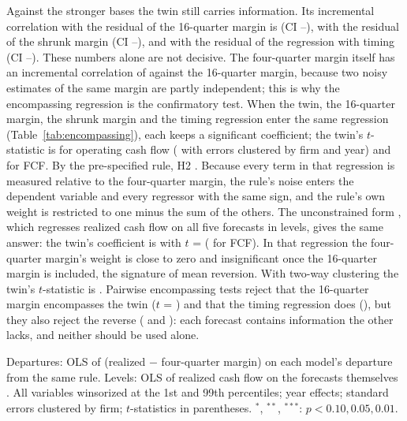 \documentclass[11pt]{article}
\begin{document}
Against the stronger bases the twin still carries information. Its incremental correlation with the residual of the 16-quarter margin is \TrTwinVsSixteen{} (CI \TrTwinVsSixteenLo--\TrTwinVsSixteenHi), with the residual of the shrunk margin \TrTwinVsShrunk{} (CI \TrTwinVsShrunkLo--\TrTwinVsShrunkHi), and with the residual of the regression with timing \TrTwinVsReg{} (CI \TrTwinVsRegLo--\TrTwinVsRegHi). These numbers alone are not decisive. The four-quarter margin itself has an incremental correlation of \TrFourVsSixteen{} against the 16-quarter margin, because two noisy estimates of the same margin are partly independent; this is why the encompassing regression is the confirmatory test. When the twin, the 16-quarter margin, the shrunk margin and the timing regression enter the same regression (Table~\ref{tab:encompassing}), each keeps a significant coefficient; the twin's $t$-statistic is \TrEncTwinT{} for operating cash flow (\TrEncTwinTTwoWay{} with errors clustered by firm and year) and \TrEncFcfTwinT{} for FCF. By the pre-specified rule, H2 \TrVerdict. Because every term in that regression is measured relative to the four-quarter margin, the rule's noise enters the dependent variable and every regressor with the same sign, and the rule's own weight is restricted to one minus the sum of the others. The unconstrained form \citep{fair1990}, which regresses realized cash flow on all five forecasts in levels, gives the same answer: the twin's coefficient is \TrEncLevTwinCoef{} with $t$ = \TrEncLevTwinT{} (\TrEncLevFcfTwinT{} for FCF). In that regression the four-quarter margin's weight is close to zero and insignificant once the 16-quarter margin is included, the signature of mean reversion. With two-way clustering the twin's $t$-statistic is \TrEncLevelsTwinTTwoWay. Pairwise encompassing tests \citep{harvey1998} reject that the 16-quarter margin encompasses the twin ($t$ = \TrHlnSixteenOverTwin) and that the timing regression does (\TrHlnRegOverTwin), but they also reject the reverse (\TrHlnTwinOverSixteen{} and \TrHlnTwinOverReg): each forecast contains information the other lacks, and neither should be used alone.

\begin{table}[t]
\centering\scriptsize
\caption{Forecast encompassing}
\label{tab:encompassing}

\par\smallskip
\begin{minipage}{\linewidth}\footnotesize
Departures: OLS of (realized $-$ four-quarter margin) on each model's departure from the same rule. Levels: OLS of realized cash flow on the forecasts themselves \citep{fair1990}. All variables winsorized at the 1st and 99th percentiles; year effects; standard errors clustered by firm; $t$-statistics in parentheses. $^{*}$, $^{**}$, $^{***}$: $p<0.10, 0.05, 0.01$.
\end{minipage}
\end{table}
\end{document}
